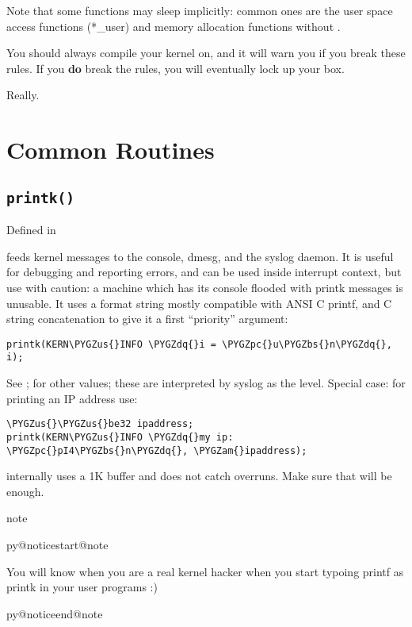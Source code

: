 \documentclass[a4paper,8pt,english]{sphinxmanual}
\makeatletter
\renewenvironment{notice}[2]{%
          \def\py@noticetype{#1}
          \begin{coloredbox}{#1}
          \bf\it
          \par\strong{#2}
          \csname py@noticestart@#1\endcsname
        }
	{
          \csname py@noticeend@\py@noticetype\endcsname
          \end{coloredbox}
        }
\def\PYGZbs{\char`\\}
\def\PYGZus{\char`\_}
\def\PYGZam{\char`\&}
\def\PYGZpc{\char`\%}
\def\PYGZdq{\char`\"}
\makeatother
\begin{document}
Note that some functions may sleep implicitly: common ones are the user
space access functions (*\_user) and memory allocation functions
without .

You should always compile your kernel  on,
and it will warn you if you break these rules. If you \textbf{do} break the
rules, you will eventually lock up your box.

Really.


\section{Common Routines}
\label{kernel-hacking/hacking:common-routines}

\subsection{\texttt{printk()}}
\label{kernel-hacking/hacking:printk}
Defined in 

 feeds kernel messages to the console, dmesg, and
the syslog daemon. It is useful for debugging and reporting errors, and
can be used inside interrupt context, but use with caution: a machine
which has its console flooded with printk messages is unusable. It uses
a format string mostly compatible with ANSI C printf, and C string
concatenation to give it a first ``priority'' argument:

\begin{Verbatim}[commandchars=\\\{\}]
printk(KERN\PYGZus{}INFO \PYGZdq{}i = \PYGZpc{}u\PYGZbs{}n\PYGZdq{}, i);
\end{Verbatim}

See ; for other  values; these are
interpreted by syslog as the level. Special case: for printing an IP
address use:

\begin{Verbatim}[commandchars=\\\{\}]
\PYGZus{}\PYGZus{}be32 ipaddress;
printk(KERN\PYGZus{}INFO \PYGZdq{}my ip: \PYGZpc{}pI4\PYGZbs{}n\PYGZdq{}, \PYGZam{}ipaddress);
\end{Verbatim}

 internally uses a 1K buffer and does not catch
overruns. Make sure that will be enough.

\begin{notice}{note}{Note:}
You will know when you are a real kernel hacker when you start
typoing printf as printk in your user programs :)
\end{notice}
\end{document}
